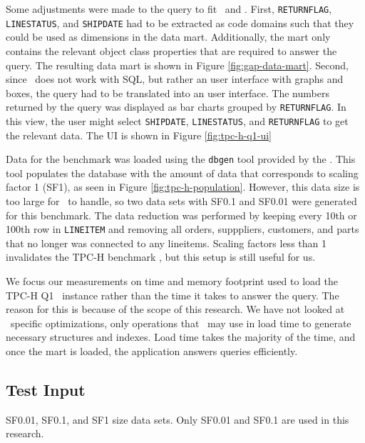Some adjustments were made to the query to fit \gap~and \gd. First, \texttt{RETURNFLAG}, \texttt{LINESTATUS}, and \texttt{SHIPDATE} had to be extracted as code domains such that they could be used as dimensions in the data mart. Additionally, the mart only contains the relevant object class properties that are required to answer the query. The resulting data mart is shown in Figure \ref{fig:gap-data-mart}. Second, since \gd~does not work with SQL, but rather an user interface with graphs and boxes, the query had to be translated into an user interface. The numbers returned by the query was displayed as bar charts grouped by \texttt{RETURNFLAG}. In this view, the user might select \texttt{SHIPDATE}, \texttt{LINESTATUS}, and \texttt{RETURNFLAG} to get the relevant data. The UI is shown in Figure \ref{fig:tpc-h-q1-ui}

Data for the benchmark was loaded using the \texttt{dbgen} tool provided by the . This tool populates the database with the amount of data that corresponds to scaling factor 1 (SF1), as seen in Figure \ref{fig:tpc-h-population}. However, this data size is too large for \gap~to handle, so two data sets with SF0.1 and SF0.01 were generated for this benchmark. The data reduction was performed by keeping every 10th or 100th row in \texttt{LINEITEM} and removing all orders, supppliers, customers, and parts that no longer was connected to any lineitems. Scaling factors less than 1 invalidates the TPC-H benchmark \cite{Transaction_Processing_Performance_Council_TPC2014-ux}, but this setup is still useful for us.

We focus our measurements on time and memory footprint used to load the TPC-H Q1 \gd~instance rather than the time it takes to answer the query. The reason for this is because of the scope of this research. We have not looked at \gd~specific optimizations, only operations that \gd~may use in load time to generate necessary structures and indexes. Load time takes the majority of the time, and once the mart is loaded, the application answers queries efficiently.

\subsection{Test Input}
\label{sub:Test Input}
SF0.01, SF0.1, and SF1 size data sets. Only SF0.01 and SF0.1 are used in this research.

